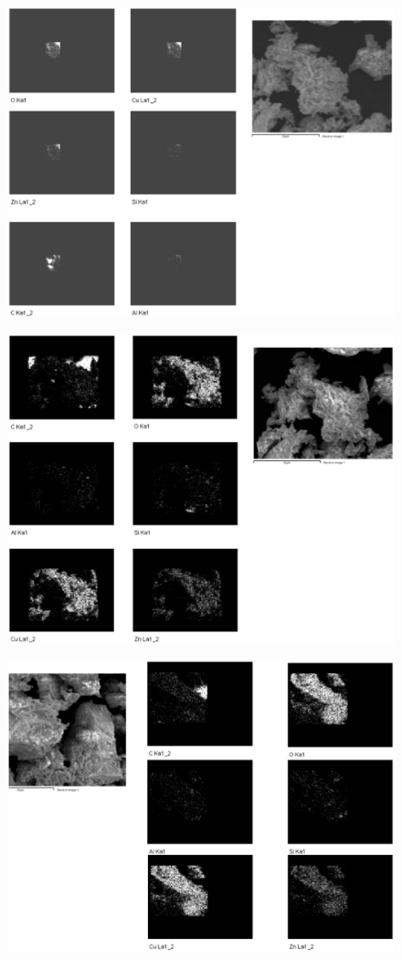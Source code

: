 \begin{figure}[H]
\centering
  \includegraphics[width=0.9\linewidth]{Az1_EDS_map1_250221_imgs}
\label{fig:az1_map1}
\end{figure}

\begin{figure}[H]
\centering
  \includegraphics[width=0.9\linewidth]{Az1_EDS_map2_250221_imgs}
\label{fig:az1_map2}
\end{figure}

\begin{figure}[H]
\centering
  \includegraphics[width=0.9\linewidth]{Az1_EDS_map3_250221_imgs}
\label{fig:az1_map3}
\end{figure}


